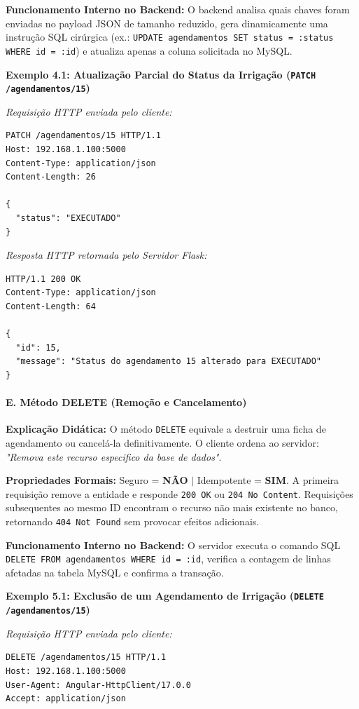 \textbf{Funcionamento Interno no Backend:} O backend analisa quais chaves foram enviadas no payload JSON de tamanho reduzido, gera dinamicamente uma instrução SQL cirúrgica (ex.: \texttt{UPDATE agendamentos SET status = :status WHERE id = :id}) e atualiza apenas a coluna solicitada no MySQL.

\textbf{Exemplo 4.1: Atualização Parcial do Status da Irrigação (\texttt{PATCH /agendamentos/15})}

\textit{Requisição HTTP enviada pelo cliente:}
\begin{lstlisting}
PATCH /agendamentos/15 HTTP/1.1
Host: 192.168.1.100:5000
Content-Type: application/json
Content-Length: 26

{
  "status": "EXECUTADO"
}
\end{lstlisting}

\textit{Resposta HTTP retornada pelo Servidor Flask:}
\begin{lstlisting}
HTTP/1.1 200 OK
Content-Type: application/json
Content-Length: 64

{
  "id": 15,
  "message": "Status do agendamento 15 alterado para EXECUTADO"
}
\end{lstlisting}

\paragraph*{E. Método DELETE (Remoção e Cancelamento)}

\textbf{Explicação Didática:} O método \texttt{DELETE} equivale a destruir uma ficha de agendamento ou cancelá-la definitivamente. O cliente ordena ao servidor: \textit{"Remova este recurso especifico da base de dados"}.

\textbf{Propriedades Formais:} Seguro = \textbf{NÃO} $|$ Idempotente = \textbf{SIM}. A primeira requisição remove a entidade e responde \texttt{200 OK} ou \texttt{204 No Content}. Requisições subsequentes ao mesmo ID encontram o recurso não mais existente no banco, retornando \texttt{404 Not Found} sem provocar efeitos adicionais.

\textbf{Funcionamento Interno no Backend:} O servidor executa o comando SQL \texttt{DELETE FROM agendamentos WHERE id = :id}, verifica a contagem de linhas afetadas na tabela MySQL e confirma a transação.

\textbf{Exemplo 5.1: Exclusão de um Agendamento de Irrigação (\texttt{DELETE /agendamentos/15})}

\textit{Requisição HTTP enviada pelo cliente:}
\begin{lstlisting}
DELETE /agendamentos/15 HTTP/1.1
Host: 192.168.1.100:5000
User-Agent: Angular-HttpClient/17.0.0
Accept: application/json

\end{lstlisting}

